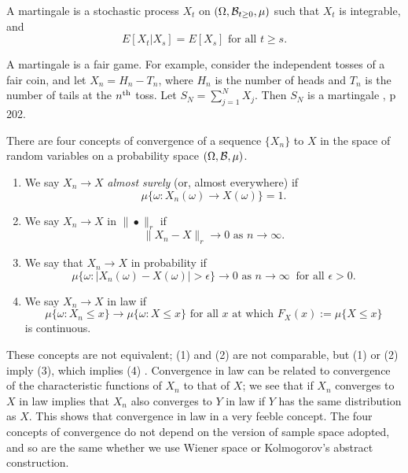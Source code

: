 A martingale is a stochastic process $X_t$ on $(\Omega,{\cal B}_{t\geq 0}
,\mu)$ such that $X_t$ is integrable, and
\begin{equation}
E[X_t|X_s]=E[X_s]\mbox{ for all }t\geq s.
\label{martingale}
\end{equation}

A martingale is a fair game.
For example, consider the independent tosses of a fair coin,
and let $X_n=H_n-T_n$, where $H_n$ is the number of heads and $T_n$ is
the number of tails at the $n^{\rm th}$ toss. Let $S_N=\sum_{j=1}^NX_j$.
Then $S_N$ is a martingale \cite{Grimmett}, p 202.

There are four concepts of convergence of a sequence $\{X_n\}$
to $X$ in the space of random variables on a probability space $(\Omega,
{\cal B},\mu)$.
\begin{enumerate}
\item We say $X_n\rightarrow X$ {\em almost surely} (or, almost
everywhere) if
\[\mu\{\omega:X_n(\omega)\rightarrow X(\omega)\}=1.\]
\item We say $X_n\rightarrow X\mbox{ in }\|\bullet\|_r$ if
\[\|X_n-X\|_r\rightarrow0\mbox{ as }n\rightarrow\infty.\]
\item We say that $X_n\rightarrow X$ in probability if
\[\mu\{\omega:|X_n(\omega)-X(\omega)|>\epsilon\}\rightarrow0 \mbox{ as }
n\rightarrow\infty\;\;\mbox{for all }\epsilon>0.\]
\item We say $X_n\rightarrow X$ in law if
\[\mu\{\omega:X_n\leq x\}\rightarrow\mu\{\omega:X\leq x\}\mbox{ for all }
x\mbox{ at which }F_X(x):=\mu\{X\leq x\}\]
is continuous.
\end{enumerate}
These concepts are not equivalent; (1) and (2) are not comparable, but
(1) or (2) imply (3), which
implies (4) \cite{Grimmett}. Convergence in law can be
related to convergence of the characteristic functions of $X_n$ to that of
$X$; we see that if $X_n$ converges to $X$ in law implies that $X_n$
also converges to $Y$ in law if $Y$ has the same distribution as $X$.
This shows that convergence in law in a very feeble concept.
The four concepts of convergence do not depend
on the version of sample space adopted, and so are the same whether we use
Wiener space or Kolmogorov's abstract construction. 

